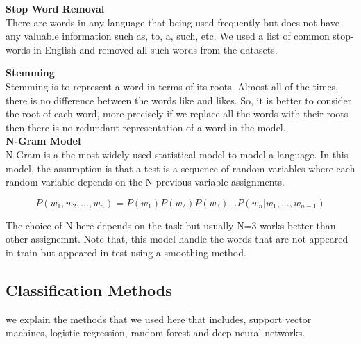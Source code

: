 \documentclass[letterpaper, 12pt]{article}
\begin{document}
\vspace*{10pt}
\textbf{Stop Word Removal}\\


There are words in any language that being used frequently but does not have any valuable information such as, to, a, such, etc. We used a list of common stop-words in English and removed all such words from the datasets.   



\vspace*{10pt}
\textbf{Stemming}\\

Stemming is to represent a word in terms of its roots. Almost all of the times,  there is no difference between the words like and likes. So, it is better to consider the root of each word, more precisely if we replace all the words with their roots then there is no redundant representation of a word in the model. \\

\vspace*{10pt}
\textbf{N-Gram Model}\\

N-Gram is a the most widely used statistical model to model a language. In this model, the assumption is that a test is a sequence of random variables where each random variable depends on the N previous variable assignments. 

\[
	P(w_1, w_2, \ldots, w_n) = P(w_1) P(w_2) P(w_3) \ldots P(w_n|w_1, \ldots, w_{n-1})
\]

The choice of N here depends on the task but usually N=3 works better than other assignemnt. Note that, this model handle the words that are not appeared in train but appeared in test using a smoothing method. \\



\vspace*{10pt}
\subsection{Classification Methods}

we explain the methods that we used here that includes, support vector machines, logistic regression, random-forest and deep neural networks.  
\end{document}

